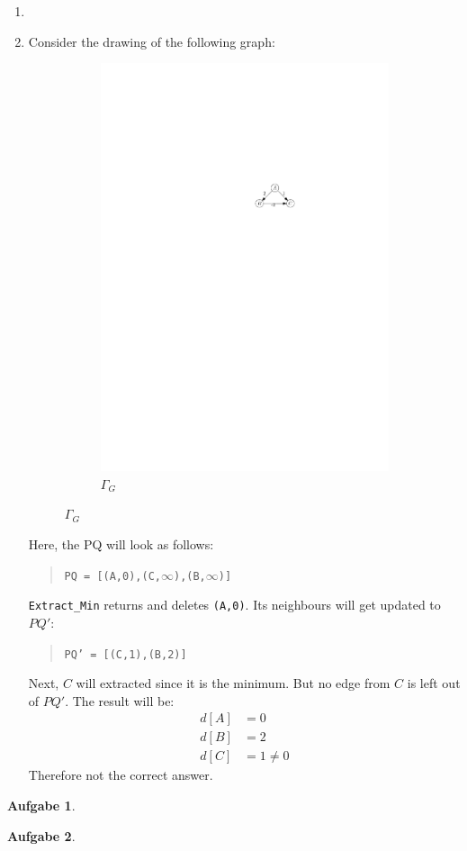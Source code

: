 \documentclass[a4paper,12pt,headsepline]{scrartcl}
\newtheorem{aufgabe}{Aufgabe}
\begin{document}
\begin{enumerate}
	\item 
	\item Consider the drawing of the following graph:
	\begin{figure}[H]
		\centering
		\begin{subfigure}{0.8\textwidth}
			\centering
			\includegraphics{22.pdf}
			\caption*{$\Gamma_G$}
		\end{subfigure}
	\end{figure}
	Here, the PQ will look as follows:
	\begin{quotation}
		\texttt{PQ = [(A,0),(C,$\infty$),(B,$\infty$)]}
	\end{quotation}
\texttt{Extract\_Min} returns and deletes \texttt{(A,0)}. Its neighbours will get updated to $PQ'$:
\begin{quotation}
	\texttt{PQ' = [(C,1),(B,2)]}
\end{quotation}
Next, $C$ will extracted since it is the minimum. But no edge from $C$ is left out of $PQ'$. The result will be:
\begin{align*}
	d[A] &= 0\\
	d[B] &= 2\\
	d[C] &= 1 \neq 0
\end{align*}
Therefore not the correct answer.
\end{enumerate}

\newpage
\begin{aufgabe}
\end{aufgabe}

\newpage
\begin{aufgabe}
\end{aufgabe}
\end{document}
